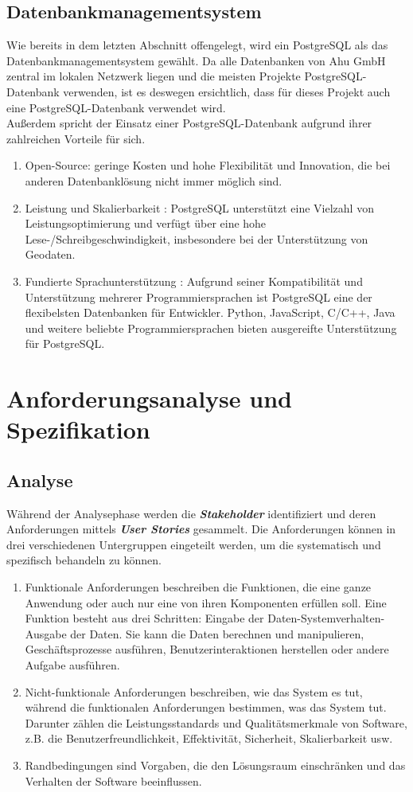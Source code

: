 \documentclass[a4paper,12pt]{scrreprt}
\begin{document}
\section{Datenbankmanagementsystem}
Wie bereits in dem letzten Abschnitt offengelegt, wird ein PostgreSQL als das Datenbankmanagementsystem gewählt. 
Da alle Datenbanken von Ahu GmbH zentral im lokalen Netzwerk liegen und die meisten Projekte PostgreSQL-Datenbank verwenden, ist es deswegen ersichtlich, dass für dieses Projekt auch eine PostgreSQL-Datenbank verwendet wird. \\
Außerdem spricht der Einsatz einer PostgreSQL-Datenbank aufgrund ihrer zahlreichen Vorteile für sich.
\begin{enumerate}
\item Open-Source: geringe Kosten und hohe Flexibilität und Innovation, die bei anderen Datenbanklösung nicht immer möglich sind. 
\item Leistung und Skalierbarkeit : PostgreSQL unterstützt eine Vielzahl von Leistungsoptimierung und verfügt über eine hohe Lese-/Schreibgeschwindigkeit, insbesondere bei der Unterstützung von Geodaten.
\item Fundierte Sprachunterstützung : Aufgrund seiner Kompatibilität und Unterstützung mehrerer Programmiersprachen ist PostgreSQL eine der flexibelsten Datenbanken für Entwickler. Python, JavaScript, C/C++, Java und weitere beliebte Programmiersprachen bieten ausgereifte Unterstützung für PostgreSQL.
\end{enumerate}

\chapter{Anforderungsanalyse und Spezifikation }
\section{Analyse}
Während der Analysephase werden die \textbf{\textit{Stakeholder}} identifiziert und deren Anforderungen mittels \textbf{\textit{User Stories}} gesammelt. Die Anforderungen können in drei verschiedenen Untergruppen eingeteilt werden, um die systematisch und spezifisch behandeln zu können.
\begin{enumerate}
\item Funktionale Anforderungen beschreiben die Funktionen, die eine ganze Anwendung oder auch nur eine von ihren Komponenten erfüllen soll. Eine Funktion besteht aus drei Schritten: Eingabe der Daten-Systemverhalten-Ausgabe der Daten. Sie kann die Daten berechnen und manipulieren, Geschäftsprozesse ausführen, Benutzerinteraktionen herstellen oder andere Aufgabe ausführen.
\item Nicht-funktionale Anforderungen beschreiben, wie das System es tut, während die funktionalen Anforderungen bestimmen, was das System tut. Darunter zählen die Leistungsstandards und Qualitätsmerkmale von Software, z.B. die Benutzerfreundlichkeit, Effektivität, Sicherheit, Skalierbarkeit usw.
\item Randbedingungen sind Vorgaben, die den Lösungsraum einschränken und das Verhalten der Software beeinflussen.
\end{enumerate}
\end{document}
